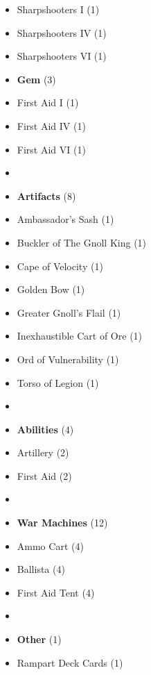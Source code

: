 \begin{multicols*}{3}
\begin{itemize}[leftmargin=0pt, label={}, noitemsep, noitemsep]
  \item Sharpshooters I (1)
  \item Sharpshooters IV (1)
  \item Sharpshooters VI (1)
  \item \textbf{Gem} (3)
  \item First Aid I (1)
  \item First Aid IV (1)
  \item First Aid VI (1)
  \item
  \item \textbf{Artifacts} (8)
  \item Ambassador's Sash (1)
  \item Buckler of The Gnoll King (1)
  \item Cape of Velocity (1)
  \item Golden Bow (1)
  \item Greater Gnoll's Flail (1)
  \item Inexhaustible Cart of Ore (1)
  \item Ord of Vulnerability (1)
  \item Torso of Legion (1)
  \item
  \item \textbf{Abilities} (4)
  \item Artillery (2)
  \item First Aid (2)
  \item
  \item \textbf{War Machines} (12)
  \item Ammo Cart (4)
  \item Ballista (4)
  \item First Aid Tent (4)
  \item
  \item \textbf{Other} (1)
  \item Rampart Deck Cards (1)
\end{itemize}

\end{multicols*}
